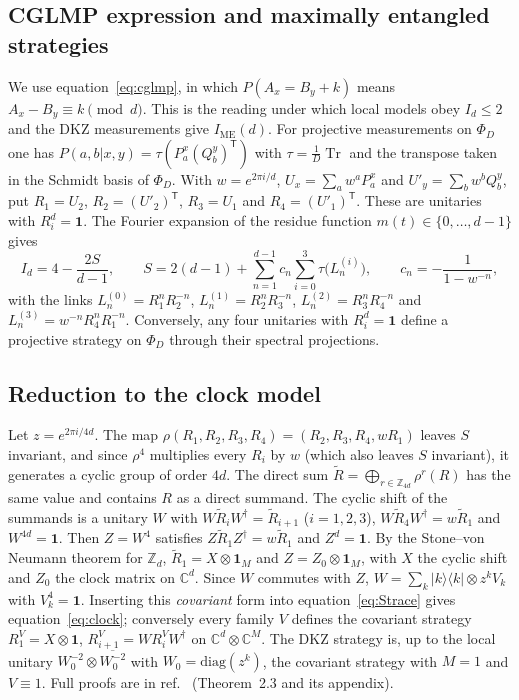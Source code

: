 \documentclass[11pt]{article}
\newcommand{\Tr}{\operatorname{Tr}}
\newcommand{\C}{\mathbb{C}}
\newcommand{\Z}{\mathbb{Z}}
\newcommand{\one}{\mathbf{1}}
\newcommand{\IME}{I_{\mathrm{ME}}}
\begin{document}
\subsection*{CGLMP expression and maximally entangled strategies}
We use equation~\eqref{eq:cglmp}, in which $P(A_x=B_y+k)$ means $A_x-B_y\equiv k\pmod d$. This is the reading under
which local models obey $I_d\le2$ and the DKZ measurements give $\IME(d)$\cite{CGLMP2002}. For projective measurements
on $\Phi_D$ one has $P(a,b|x,y)=\tau(P^x_a(Q^y_b)^{\mathsf T})$ with $\tau=\frac1D\Tr$ and the transpose taken in the
Schmidt basis of $\Phi_D$. With $w=e^{2\pi i/d}$, $U_x=\sum_aw^aP^x_a$ and $U'_y=\sum_bw^bQ^y_b$, put $R_1=U_2$,
$R_2=(U'_2)^{\mathsf T}$, $R_3=U_1$ and $R_4=(U'_1)^{\mathsf T}$. These are unitaries with $R_i^d=\one$. The
Fourier expansion of the residue function $m(t)\in\{0,\dots,d-1\}$ gives
\begin{equation}\label{eq:Strace}
I_d=4-\frac{2S}{d-1},\qquad S=2(d-1)+\sum_{n=1}^{d-1}c_n\sum_{i=0}^{3}\tau\bigl(L^{(i)}_n\bigr),\qquad
c_n=-\frac{1}{1-w^{-n}},
\end{equation}
with the links $L^{(0)}_n=R_1^nR_2^{-n}$, $L^{(1)}_n=R_2^nR_3^{-n}$, $L^{(2)}_n=R_3^nR_4^{-n}$ and
$L^{(3)}_n=w^{-n}R_4^nR_1^{-n}$. Conversely, any four unitaries with $R_i^d=\one$ define a projective strategy on
$\Phi_D$ through their spectral projections\cite{classical2026}.

\subsection*{Reduction to the clock model}
Let $z=e^{2\pi i/4d}$. The map $\rho(R_1,R_2,R_3,R_4)=(R_2,R_3,R_4,wR_1)$ leaves $S$ invariant, and since $\rho^4$
multiplies every $R_i$ by $w$ (which also leaves $S$ invariant), it generates a cyclic group of order $4d$. The direct
sum $\tilde R=\bigoplus_{r\in\Z_{4d}}\rho^r(R)$ has
the same value and contains $R$ as a direct summand. The cyclic shift of the summands is a unitary $W$ with
$W\tilde R_iW^\dagger=\tilde R_{i+1}$ ($i=1,2,3$), $W\tilde R_4W^\dagger=w\tilde R_1$ and $W^{4d}=\one$. Then
$Z=W^4$ satisfies $Z\tilde R_1Z^\dagger=w\tilde R_1$ and $Z^d=\one$. By the Stone--von Neumann theorem for $\Z_d$,
$\tilde R_1=X\otimes\one_M$ and $Z=Z_0\otimes\one_M$, with $X$ the cyclic shift and $Z_0$ the clock matrix on $\C^d$.
Since $W$ commutes with $Z$, $W=\sum_k|k\rangle\langle k|\otimes z^kV_k$ with $V_k^4=\one$. Inserting this
\emph{covariant} form into equation~\eqref{eq:Strace} gives equation~\eqref{eq:clock}; conversely every family $V$
defines the covariant strategy $R^V_1=X\otimes\one$, $R^V_{i+1}=WR^V_iW^\dagger$ on $\C^d\otimes\C^M$. The DKZ
strategy is, up to the local unitary $W_0^{-2}\otimes\overline{W_0^{-2}}$ with $W_0=\mathrm{diag}(z^k)$, the covariant
strategy with $M=1$ and $V\equiv1$. Full proofs are in ref.~ (Theorem~2.3 and its appendix).
\end{document}
